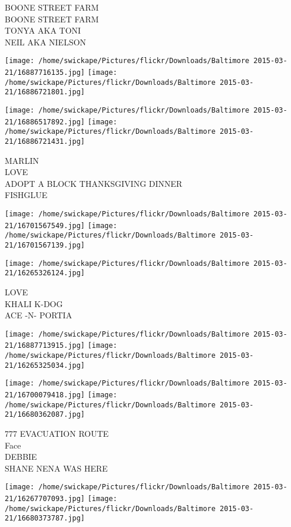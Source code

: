 \documentclass[10pt,letterpaper]{article}
\begin{document}
BOONE STREET FARM\\
BOONE STREET FARM\\
TONYA AKA TONI\\
NEIL AKA NIELSON\\
\pagebreak

\texttt{[image: /home/swickape/Pictures/flickr/Downloads/Baltimore 2015-03-21/16887716135.jpg]}
\texttt{[image: /home/swickape/Pictures/flickr/Downloads/Baltimore 2015-03-21/16886721801.jpg]}

\texttt{[image: /home/swickape/Pictures/flickr/Downloads/Baltimore 2015-03-21/16886517892.jpg]}
\texttt{[image: /home/swickape/Pictures/flickr/Downloads/Baltimore 2015-03-21/16886721431.jpg]}

MARLIN\\
LOVE\\
ADOPT A BLOCK THANKSGIVING DINNER\\
FISHGLUE\\
\pagebreak

\texttt{[image: /home/swickape/Pictures/flickr/Downloads/Baltimore 2015-03-21/16701567549.jpg]}
\texttt{[image: /home/swickape/Pictures/flickr/Downloads/Baltimore 2015-03-21/16701567139.jpg]}

\vspace{0.25in}
\texttt{[image: /home/swickape/Pictures/flickr/Downloads/Baltimore 2015-03-21/16265326124.jpg]}

LOVE\\
KHALI K{-}DOG\\
ACE {-}N{-} PORTIA\\
\pagebreak

\texttt{[image: /home/swickape/Pictures/flickr/Downloads/Baltimore 2015-03-21/16887713915.jpg]}
\texttt{[image: /home/swickape/Pictures/flickr/Downloads/Baltimore 2015-03-21/16265325034.jpg]}

\texttt{[image: /home/swickape/Pictures/flickr/Downloads/Baltimore 2015-03-21/16700079418.jpg]}
\texttt{[image: /home/swickape/Pictures/flickr/Downloads/Baltimore 2015-03-21/16680362087.jpg]}

777 EVACUATION ROUTE\\
Face\\
DEBBIE\\
SHANE NENA WAS HERE\\
\pagebreak

\texttt{[image: /home/swickape/Pictures/flickr/Downloads/Baltimore 2015-03-21/16267707093.jpg]}
\texttt{[image: /home/swickape/Pictures/flickr/Downloads/Baltimore 2015-03-21/16680373787.jpg]}
\end{document}
